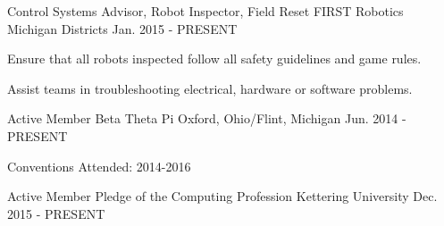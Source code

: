 

\begin{cventries}

  \cventry
    {Control Systems Advisor, Robot Inspector, Field Reset} %
    {FIRST Robotics} %
    {Michigan Districts} %
    {Jan. 2015 - PRESENT} %
    {
      \begin{cvitems} %
        \item {Ensure that all robots inspected follow all safety guidelines and game rules.}
        \item {Assist teams in troubleshooting electrical, hardware or software problems.}
      \end{cvitems}
    }

  \cventry
    {Active Member} %
    {Beta Theta Pi} %
    {Oxford, Ohio/Flint, Michigan} %
    {Jun. 2014 - PRESENT} %
    {
      \begin{cvitems} %
        \item {Conventions Attended: 2014-2016}
      \end{cvitems}
    }

  \cventry
    {Active Member} %
    {Pledge of the Computing Profession} %
    {Kettering University} %
    {Dec. 2015 - PRESENT} %
    {
      \begin{cvitems} %
      \end{cvitems}
    }


\end{cventries}
